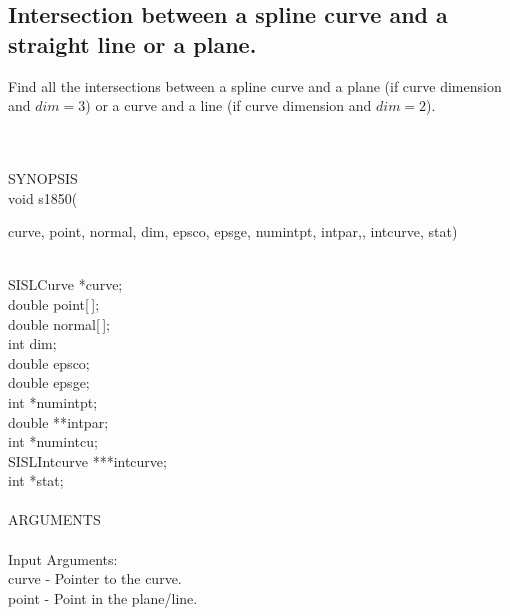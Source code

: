 \subsection{\sloppy Intersection between a spline curve and a straight line or a plane.}
\begin{minipg1}
        Find all the intersections between a spline curve and a plane (if
        curve dimension and $dim=3$)
        or a curve and a line (if curve dimension and $dim=2$).
\end{minipg1} \\ \\
SYNOPSIS\\
        \>void s1850(\begin{minipg3}
        {\fov curve}, {\fov point}, {\fov normal}, {\fov dim}, {\fov epsco}, {\fov epsge}, {\fov numintpt},
        {\fov intpar},, {\fov intcurve}, {\fov stat})
                \end{minipg3}\\[0.3ex]
                \>\>    SISLCurve       \>      *{\fov curve};\\
                \>\>    double  \>      {\fov point}[\,];\\
                \>\>    double  \>      {\fov normal}[\,];\\
                \>\>    int     \>      {\fov dim};\\
                \>\>    double  \>      {\fov epsco};\\
                \>\>    double  \>      {\fov epsge};\\
                \>\>    int     \>      *{\fov numintpt};\\
                \>\>    double  \>      **{\fov intpar};\\
                \>\>    int     \>      *{\fov numintcu};\\
                \>\>    SISLIntcurve \> ***{\fov intcurve};\\
                \>\>    int     \>      *{\fov stat};\\
\\
ARGUMENTS\\
\\
        \>Input Arguments:\\
        \>\>    {\fov curve}    \> - \> Pointer to the curve.\\
        \>\>    {\fov point}    \> - \> Point in the plane/line.\\
